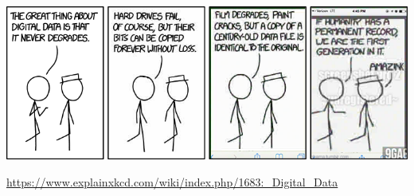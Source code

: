 \documentclass[a4paper, french, 12pt]{article}  %
\newcounter{thme}
\newcounter{alg}
\begin{document}
\begin{center}
\includegraphics[scale=0.8]{images/digital_data.png}

\url{https://www.explainxkcd.com/wiki/index.php/1683:_Digital_Data}

\end{center}
%
%
%
%
%
%
%
%
%
\end{document}
